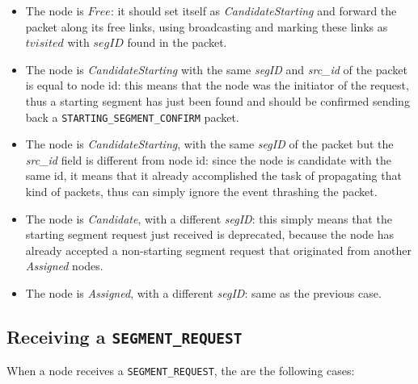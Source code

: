 \begin{itemize}
\item The node is $Free$: it should set itself as
\emph{CandidateStarting} and forward the packet along its free links, using
broadcasting and marking these links as $tvisited$ with $segID$ found
in the packet.
\item The node is \emph{CandidateStarting} with the same
\emph{segID} and \emph{src\_id} of the packet is equal to node id:
this means that the node was the initiator of the request, thus a starting segment has
just been found and should be confirmed sending back a \texttt{STARTING\_SEGMENT\_CONFIRM}
packet.  
\item The node is \emph{CandidateStarting}, with the same \emph{segID} of the
packet but the \emph{src\_id} field is different from node id: since the node is candidate with the same id, it means
that it already accomplished the task of propagating that kind of
packets, thus can simply ignore the event thrashing the packet.  
\item The node is \emph{Candidate}, with a different \emph{segID}: 
this simply means that the starting segment request just received is deprecated,
because the node has already accepted a non-starting segment request
that originated from another \emph{Assigned} nodes.
\item The node is \emph{Assigned}, with a different \emph{segID}:
same as the previous case. 


\end{itemize}

\subsection{Receiving a \texttt{SEGMENT\_REQUEST}}
When a node receives a \texttt{SEGMENT\_REQUEST}, the are the following cases:

